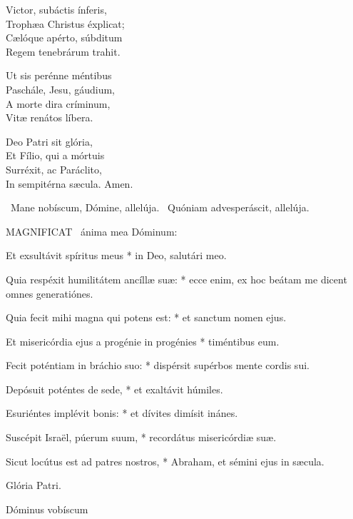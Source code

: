 Victor, subáctis ínferis,\\
Trophæa Christus éxplicat;\\
Cælóque apérto, súbditum\\
Regem tenebrárum trahit.

Ut sis perénne méntibus\\
Paschále, Jesu, gáudium,\\
A morte dira críminum,\\
Vitæ renátos líbera.

Deo Patri sit glória,\\
Et Fílio, qui a mórtuis\\
Surréxit, ac Paráclito,\\
In sempitérna sæcula. Amen.

\V\ Mane nobíscum, Dómine, allelúja. \R\ Quóniam advesperáscit, allelúja.



\lettrine[lines=2]{M}{AGNIFICAT} \textdagger\ ánima mea Dóminum:

Et exsultávit spíritus meus * in Deo, salutári meo.

Quia respéxit humilitátem ancíllæ suæ: * ecce enim, ex hoc beátam me dicent omnes generatiónes.

Quia fecit mihi magna qui potens est: * et sanctum nomen ejus.

Et misericórdia ejus a progénie in progénies * timéntibus eum.

Fecit poténtiam in bráchio suo: * dispérsit supérbos mente cordis sui.

Depósuit poténtes de sede, * et exaltávit húmiles.

Esuriéntes implévit bonis: * et dívites dimísit inánes.

Suscépit Israël, púerum suum, * recordátus misericórdiæ suæ.

Sicut locútus est ad patres nostros, * Abraham, et sémini ejus in sæcula.

Glória Patri.

 Dóminus vobíscum 


